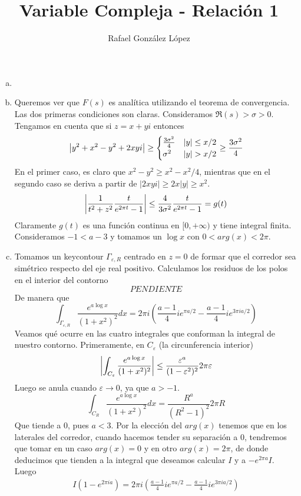 \documentclass[twoside]{article}
\begin{document}
\title{Variable Compleja - Relación 1}
\author{Rafael González López}
\maketitle
\begin{ejercicio}{2}
\end{ejercicio}
\begin{solucion}
\begin{enumerate}[a.]
\item[]
\item 
Queremos ver que $F(s)$ es analítica utilizando el teorema de convergencia. Las dos primeras condiciones son claras. Consideramos $\Re(s)>\sigma >0$. Tengamos en cuenta que si $z=x+yi$ entonces
$$
\abs{y^2+x^2-y^2+2xyi} \geq
\begin{cases}
\frac{3\sigma^2}{4} & |y|\leq x/2\\
\sigma^2 & |y|>x/2
\end{cases} \geq \frac{3\sigma^2}{4} 
$$
En el primer caso, es claro que $x^2-y^2 \geq x^2-x^2/4$, mientras que en el segundo caso se deriva a partir de $|2xyi|\geq 2x|y|\geq x^2$.
\begin{align*}
\left\lvert\frac{1}{t^2+z^2}\frac{t}{e^{2\pi t}-1}\right\rvert \leq \frac{4}{3\sigma^2}\frac{t}{e^{2\pi t}-1}= g(t)
\end{align*}
Claramente $g(t)$ es una función continua en $[0,+\infty)$ y tiene integral finita. Consideramos $-1<a-3$ y tomamos un $\log x$ con $0<arg(x)<2\pi$.

\item Tomamos un keycontour $\Gamma_{\varepsilon,R}$ centrado en $z=0$ de formar que el corredor sea simétrico respecto del eje  real positivo. Calculamos los residuos de los polos en el interior del contorno
$$
PENDIENTE
$$
De manera que
$$
\int_{\Gamma_{\varepsilon,R}} \frac{e^{a \log x}}{(1+x^2)^2}dx = 2\pi i\left( \frac{a-1}{4}ie^{\pi a/2}-\frac{a-1}{4}ie^{3\pi i a /2}\right)
$$
Veamos qué ocurre en las cuatro integrales que conforman la integral de nuestro contorno. Primeramente, en $C_\varepsilon$ (la circunferencia interior)
$$
\left\lvert\int_{C_\varepsilon}\frac{e^{a \log x}}{(1+x^2)^2} \right\rvert\leq \frac{\varepsilon^a}{(1-\varepsilon^2)^2}2\pi \varepsilon 
$$ 
Luego se anula cuando $\varepsilon \to 0$, ya que $a>-1$.
$$
\int_{C_R} \frac{e^{a \log x}}{(1+x^2)^2} dx = \frac{R^a}{(R^2-1)^2}2\pi R
$$
Que tiende a $0$, pues $a<3$. Por la elección del $arg(x)$ tenemos que en los laterales del corredor, cuando hacemos tender su separación a $0$, tendremos que tomar en un caso $arg(x)=0$ y en otro $arg(x)=2\pi$, de donde deducimos que tienden a la integral que deseamos calcular $I$ y a $-e^{2\pi a}I$. Luego
\begin{align*}
I(1-e^{2\pi i a}) = 2\pi i\left( \frac{a-1}{4}ie^{\pi a/2}-\frac{a-1}{4}ie^{3\pi i a /2}\right)
\end{align*} 
\end{enumerate}

\end{solucion}
\end{document}
